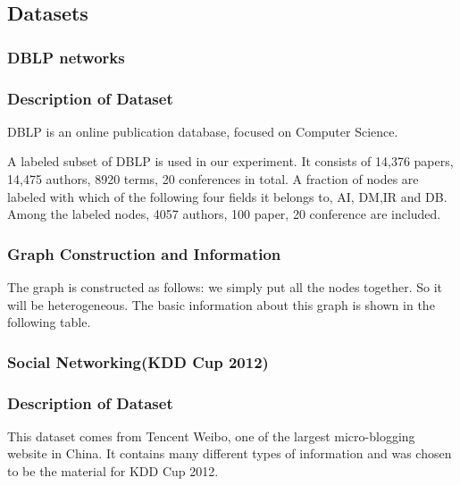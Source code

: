 \subsection{Datasets}
\subsubsection{DBLP networks}
\subsubsection*{Description of Dataset}
DBLP is an online publication database, focused on Computer Science. 

A labeled subset of DBLP is used in our experiment. It consists of 14,376 papers, 14,475 authors, 8920 terms, 20 conferences in total. A fraction of nodes are labeled with which of the following four fields it belongs to, AI, DM,IR and DB. Among the labeled nodes, 4057 authors, 100 paper, 20 conference are included.
\subsubsection*{Graph Construction and Information}
The graph is constructed as follows: we simply put all the nodes together. So it will be heterogeneous. The basic information about this graph is shown in the following table.

\begin{table}[!ht]
\centering
{}
\end{table}

\subsubsection{Social Networking(KDD Cup 2012)}

\subsubsection*{Description of Dataset}
This dataset comes from Tencent Weibo, one of the largest micro-blogging website in China.
It contains many different types of information and was chosen to be the material for KDD Cup 2012.

